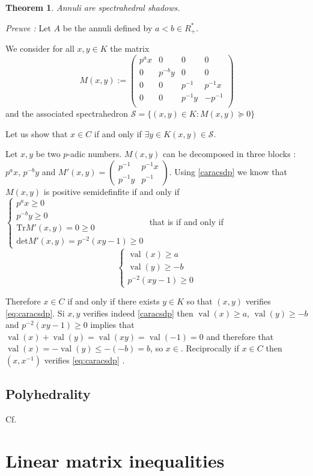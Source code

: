 \documentclass[a4paper,12pt]{article}
\newtheorem{theorem}{Theorem}
\DeclareMathOperator{\val}{val}
\begin{document}
\begin{theorem}
	Annuli are spectrahedral shadows.
\end{theorem} 

\textit{Preuve :}
Let $A$ be the annuli defined by $a<b \in R^*_+$.

We consider for all $x,y \in K $ the matrix  $$M(x,y) :=
\begin{pmatrix} 
	p^ax & 0 & 0 & 0 \\
	0 & p^{-b}y & 0 & 0 \\
	0 & 0 & p^{-1} & p^{-1}x \\
	0 & 0 & p^{-1}y & - p^{-1}  \\
\end{pmatrix} $$ and the associated spectrahedron $\mathcal{S}= \{(x,y) \in K  : M(x,y) \succeq 0\} $

Let us show that $x \in C$ if and only if  $\exists y \in K \left( x,y \right) \in \mathcal{S}$.

Let $x,y$ be two $p$-adic numbers.
$M(x,y)$ can be decomposed in three blocks : $p^ax$, $p^{-b}y $ and $M'(x,y) = \begin{pmatrix} p^{-1} & p^{-1}x \\ p^{-1} y & p^{-1}\end{pmatrix} $. Using \ref{caracsdp} we know that $M(x,y)$ is positive semidefinfite if and only if
$
\begin{cases}
	p^ax \ge 0 \\
	p^{-b}y \ge 0\\
	\text{Tr}M'\left( x,y \right) = 0 \ge 0\\
	\text{det} M'(x,y ) = p^{-2}\left( xy-1 \right)  \ge 0 
\end{cases}
$ 
that is if and only if 
\begin{equation}
	\label{eq:caracsdp} 
	\begin{cases} 
		\val\left(x\right)\ge a\\
		\val\left(y\right)\ge -b\\
		p^{-2} \left( xy-1 \right) \ge 0
	\end{cases}
\end{equation}




Therefore $x \in C$ if and only if there exists $y \in K $ so that $(x, y)$ verifies \ref{eq:caracsdp}. Si $x, y$ verifies indeed \ref{caracsdp} then $\val\left(x\right)\ge a$, $\val\left(y\right)\ge -b$ and $p^{-2} \left( xy-1 \right) \ge 0$ implies that $\val\left(x\right)+\val\left(y\right)=\val\left(xy\right) = \val\left(-1\right) =0$ and therefore that $\val\left(x\right)=-\val\left(y\right)\le -(-b)  =b$, so $x \in $. Reciprocally if $x \in C$ then $(x,x^{-1}) $ verifies \ref{eq:caracsdp}  .


\subsection{Polyhedrality}
Cf. \cite{bhardwaj2015deciding}

\section{Linear matrix inequalities}


\printbibliography
\end{document}
